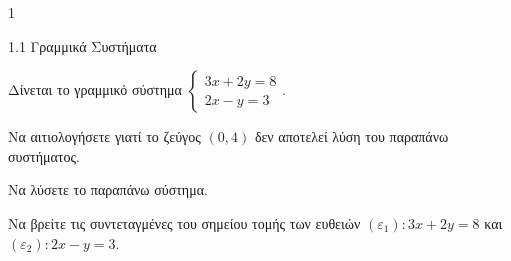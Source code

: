 \begin{ylh}{1}
\item 1.1 Γραμμικά Συστήματα
\end{ylh}
Δίνεται το γραμμικό σύστημα $\begin{cases} 3x + 2y = 8 \\ 2x - y = 3 \end{cases}$.
\begin{alist}
\item Να αιτιολογήσετε γιατί το ζεύγος $(0, 4)$ δεν αποτελεί λύση του παραπάνω συστήματος.
\item Να λύσετε το παραπάνω σύστημα.
\item Να βρείτε τις συντεταγμένες του σημείου τομής των ευθειών $(\varepsilon_1): 3x + 2y = 8$ και $(\varepsilon_2): 2x - y = 3$.
\end{alist}

